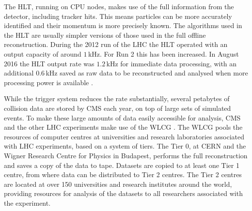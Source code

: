 
The \ac{HLT}, running on CPU nodes, makes use of the full information
from the detector, including tracker hits. This means particles
can be more accurately identified and their momentum is more
precisely known. The algorithms used in the \ac{HLT} are usually simpler
versions of those used in the full offline reconstruction. %
During the 2012 run of the \ac{LHC} the \ac{HLT} operated with an output
capacity of around $1\,$kHz. For Run 2 this has been increased. In August 2016 
the \ac{HLT} output rate was $1.2\,$kHz for immediate data processing, with
an additional $0.6\,$kHz saved as raw data to be reconstructed and analysed when 
more processing power is available \cite{CMS-PAS-HIG-16-037}. %

While the trigger system reduces the rate substantially, several
petabytes of collision data are stored by \ac{CMS} each year, on top
of large sets of simulated events. 
To make these large amounts of data easily accessible for analysis, 
\ac{CMS} and the other \ac{LHC} experiments make use of the \ac{WLCG} \cite{lhc-wlcg}. 
The \ac{WLCG} pools the resources of computer centres at universities and research
laboratories associated with \ac{LHC} experiments, based on a system of tiers. The Tier 0, at \ac{CERN} and
the Wigner Research Centre for Physics in Budapest, performs the full reconstruction
and saves a copy of the data to tape. Datasets are copied to at least one Tier 1 centre, from
where data can be distributed to Tier 2 centres. The Tier 2 centres are located
at over 150 universities and research institutes around the world, providing 
resources for analysis of the datasets to all researchers associated with the experiment.



